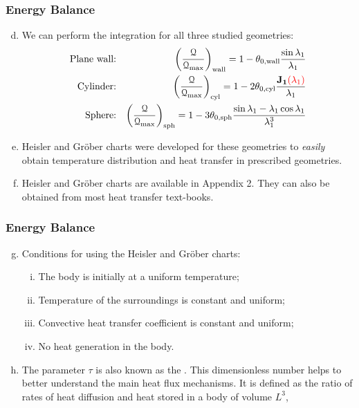 \documentclass[10pt,compress,unknownkeysallowed]{beamer}
\begin{document}
\begin{frame}
 \frametitle{Energy Balance}
   \begin{enumerate}[(a)]\setcounter{enumi}{3}%
     \item<1-> We can perform the integration for all three  studied geometries:
          \begin{eqnarray}
            \text{Plane wall:} && \left(\displaystyle\frac{\mathcal{Q}}{\mathcal{Q}_{\text{max}}}\right)_{\text{wall}} = 1 - \theta_{0,\text{wall}}\displaystyle\frac{\sin{\lambda_{1}}}{\lambda_{1}}\label{hessler:wall} \\
            \text{Cylinder:} && \left(\displaystyle\frac{\mathcal{Q}}{\mathcal{Q}_{\text{max}}}\right)_{\text{cyl}} = 1- 2\theta_{0,\text{cyl}}\displaystyle\frac{\mathbf{J_{1}}\textcolor{red}{\left(\lambda_{1}\right)}}{\lambda_{1}}\label{hessler:cylinder} \\
            \text{Sphere:} && \left(\displaystyle\frac{\mathcal{Q}}{\mathcal{Q}_{\text{max}}}\right)_{\text{sph}} = 1 - 3\theta_{0,\text{sph}}\displaystyle\frac{\sin{\lambda_{1}}-\lambda_{1}\cos{\lambda_{1}}}{\lambda_{1}^{3}}\label{hessler:sphere}
          \end{eqnarray}
      \item<2-> Heisler and Gr\"ober charts were developed for these geometries to {\it easily} obtain temperature distribution and heat transfer in prescribed geometries. 
      \item<3-> Heisler and Gr\"ober charts are available in Appendix 2. They can also be obtained from most heat transfer text-books.      
   \end{enumerate} 
\end{frame}

\begin{frame}
 \frametitle{Energy Balance}
   \begin{enumerate}[(a)]\setcounter{enumi}{6}%
     \item<1-> Conditions for using the Heisler and Gr\"ober charts:
        \begin{enumerate}[(i)]
           \item<2-> The body is initially at a uniform temperature;
           \item<2-> Temperature of the surroundings is constant and uniform;
           \item<2-> Convective heat transfer coefficient is constant and uniform;
           \item<2-> No heat generation in the body.
        \end{enumerate}
     \item<3-> The parameter $\tau$ is also known as the . This dimensionless number helps to better understand the main heat flux mechanisms. It is defined as the ratio of rates of heat diffusion and heat stored in a body of volume $L^{3}$, \ie
   \end{enumerate} 
\end{frame}
\end{document}

